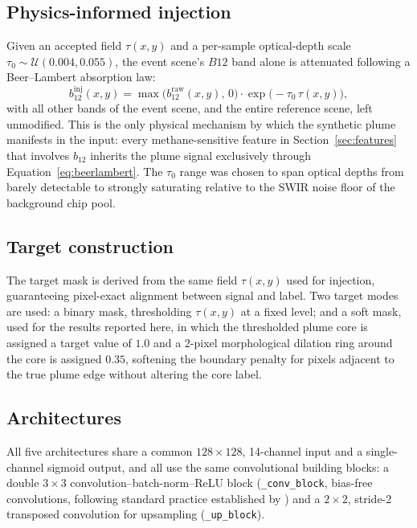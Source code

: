 \documentclass[10pt,twocolumn]{article}
\begin{document}
\subsection{Physics-informed injection}
\label{sec:injection}

Given an accepted field $\tau(x,y)$ and a per-sample optical-depth scale $\tau_0 \sim \mathcal{U}(0.004, 0.055)$, the event scene's $B12$ band alone is attenuated following a Beer--Lambert absorption law:
\begin{equation}
b_{12}^{\text{inj}}(x,y) = \max\!\big(b_{12}^{\text{raw}}(x,y),\,0\big)\cdot\exp\!\big(-\tau_0\,\tau(x,y)\big),
\label{eq:beerlambert}
\end{equation}
with all other bands of the event scene, and the entire reference scene, left unmodified. This is the only physical mechanism by which the synthetic plume manifests in the input: every methane-sensitive feature in Section~\ref{sec:features} that involves $b_{12}$ inherits the plume signal exclusively through Equation~\eqref{eq:beerlambert}. The $\tau_0$ range was chosen to span optical depths from barely detectable to strongly saturating relative to the SWIR noise floor of the background chip pool.

\subsection{Target construction}

The target mask is derived from the same field $\tau(x,y)$ used for injection, guaranteeing pixel-exact alignment between signal and label. Two target modes are used: a binary mask, thresholding $\tau(x,y)$ at a fixed level; and a soft mask, used for the results reported here, in which the thresholded plume core is assigned a target value of $1.0$ and a 2-pixel morphological dilation ring around the core is assigned $0.35$, softening the boundary penalty for pixels adjacent to the true plume edge without altering the core label.

\subsection{Architectures}
\label{sec:architectures}

All five architectures share a common $128\times128$, 14-channel input and a single-channel sigmoid output, and all use the same convolutional building blocks: a double $3{\times}3$ convolution--batch-norm--ReLU block (\texttt{\_conv\_block}, bias-free convolutions, following standard practice established by \citet{ioffe2015batchnorm}) and a $2{\times}2$, stride-2 transposed convolution for upsampling (\texttt{\_up\_block}).
\end{document}
